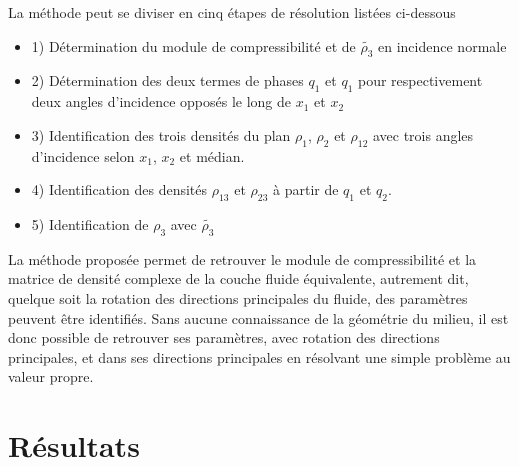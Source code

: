\documentclass[twoside,openright]{report}
\begin{document}
    La méthode peut se diviser en cinq étapes de résolution listées ci-dessous 
    \begin{itemize}
        \item 1) Détermination du module de compressibilité et de $\tilde{\rho_3}$ en incidence normale
        \item 2) Détermination des deux termes de phases $q_1$ et $q_1$ pour respectivement deux angles d'incidence opposés le long de $x_1$ et $x_2$
        \item 3) Identification des trois densités du plan $\rho_1$, $\rho_2$ et $\rho_{12}$ avec trois angles d'incidence selon $x_1$, $x_2$ et médian.
        \item 4) Identification des densités $\rho_{13}$ et $\rho_{23}$ à partir de $q_1$ et $q_2$.
        \item 5) Identification de $\rho_3$ avec $\tilde{\rho_3}$
    \end{itemize}
    
    La méthode proposée permet de retrouver le module de compressibilité et la matrice de densité complexe de la couche fluide équivalente, autrement dit, quelque soit la rotation des directions principales du fluide, des paramètres peuvent être identifiés. Sans aucune connaissance de la géométrie du milieu, il est donc possible de retrouver ses paramètres, avec rotation des directions principales, et dans ses directions principales en résolvant une simple problème au valeur propre.  
    
    
    
    
\chapter{Résultats}
\label{Ch_Res}
\end{document}

